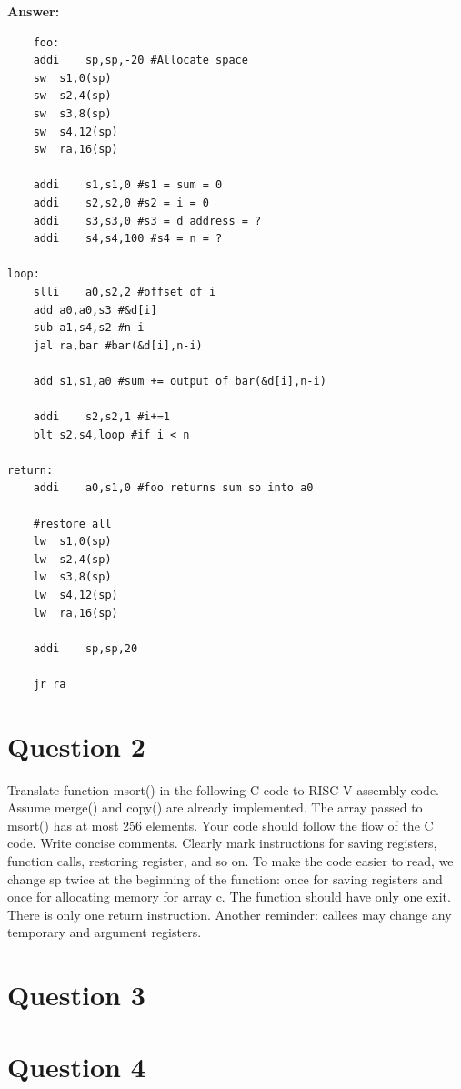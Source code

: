 \documentclass{article}
\begin{document}
\textbf{Answer:}
\begin{lstlisting}
    foo:
	addi	sp,sp,-20 #Allocate space 
	sw	s1,0(sp)
	sw	s2,4(sp)
	sw	s3,8(sp)
	sw	s4,12(sp)
	sw	ra,16(sp)
	
	addi	s1,s1,0 #s1 = sum = 0
	addi	s2,s2,0 #s2 = i = 0
	addi	s3,s3,0 #s3 = d address = ? 
	addi	s4,s4,100 #s4 = n = ? 
	
loop:	
	slli	a0,s2,2 #offset of i
	add	a0,a0,s3 #&d[i]
	sub	a1,s4,s2 #n-i
	jal	ra,bar #bar(&d[i],n-i)
	
	add	s1,s1,a0 #sum += output of bar(&d[i],n-i)
	
	addi	s2,s2,1 #i+=1
	blt	s2,s4,loop #if i < n

return:
	addi	a0,s1,0 #foo returns sum so into a0

	#restore all
	lw	s1,0(sp)
	lw	s2,4(sp)
	lw	s3,8(sp)
	lw	s4,12(sp)
	lw	ra,16(sp)
	
	addi	sp,sp,20
	
	jr ra
\end{lstlisting}

\section*{Question 2}
Translate function msort() in the following C code to RISC-V assembly code. Assume
merge() and copy() are already implemented. The array passed to msort() has at most 256
elements.
Your code should follow the flow of the C code. Write concise comments. Clearly mark
instructions for saving registers, function calls, restoring register, and so on.
To make the code easier to read, we change sp twice at the beginning of the function: once
for saving registers and once for allocating memory for array c.
The function should have only one exit. There is only one return instruction.
Another reminder: callees may change any temporary and argument registers.

\section*{Question 3}

\section*{Question 4}
\end{document}
